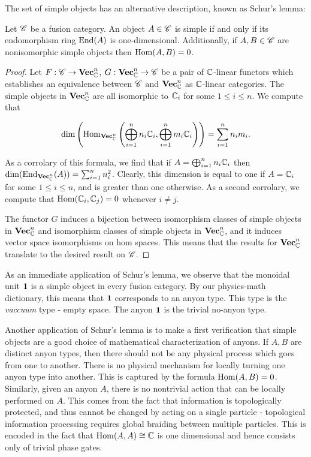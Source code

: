 The set of simple objects has an alternative description, known as Schur's lemma:

\begin{proposition} Let $\mathscr{C}$ be a fusion category. An object $A\in \mathscr{C}$ is simple if and only if its endomorphism ring $\operatorname{End}(A)$ is one-dimensional. Additionally, if $A,B\in \mathscr{C}$ are nonisomorphic simple objects then $\operatorname{Hom}(A,B)=0$.
\end{proposition}
\begin{proof} Let $F:\mathscr{C}\to \mathbf{Vec}_{\mathbb{C}}^n$, $G:\mathbf{Vec}_{\mathbb{C}}^n\to \mathscr{C}$ be a pair of $\mathbb{C}$-linear functors which establishes an equivalence between $\mathscr{C}$ and $\mathbf{Vec}_{\mathbb{C}}^n$ as $\mathbb{C}$-linear categories. The simple objects in $\mathbf{Vec}_{\mathbb{C}}^n$ are all isomorphic to $\mathbb{C}_i$ for some $1\leq i \leq n$. We compute that

$$\dim\left(\operatorname{Hom}_{\mathbf{Vec}_{\mathbb{C}}^n}\left(\bigoplus_{i=1}^n n_i \mathbb{C}_i , \bigoplus_{i=1}^n m_i \mathbb{C}_i\right)\right)=\sum_{i=1}^n n_im_i.$$

As a corrolary of this formula, we find that if $A=\bigoplus_{i=1}^n n_i\mathbb{C}_i$ then $\dim(\operatorname{End}_{\mathbf{Vec}_{\mathbb{C}}^n}(A))=\sum_{i=1}^nn_i^2$. Clearly, this dimension is equal to one if $A=\mathbb{C}_i$ for some $1\leq i\leq n$, and is greater than one otherwise. As a second corrolary, we compute that $\operatorname{Hom}(\mathbb{C}_i,\mathbb{C}_j)=0$ whenever $i\neq j$.

The functor $G$ induces a bijection between isomorphism classes of simple objects in $\mathbf{Vec}_{\mathbb{C}}^n$ and isomorphism classes of simple objects in $\mathbf{Vec}_{\mathbb{C}}^n$, and it induces vector space isomorphisms on hom spaces. This means that the results for $\mathbf{Vec}_{\mathbb{C}}^n$ translate to the desired result on $\mathscr{C}$.
\end{proof}

As an immediate application of Schur's lemma, we observe that the monoidal unit $\mathbf{1}$ is a simple object in every fusion category. By our physics-math dictionary, this means that $\mathbf{1}$ corresponds to an anyon type. This type is the \textit{vaccuum} type - empty space. The anyon $\mathbf{1}$ is the trivial no-anyon type.

Another application of Schur's lemma is to make a first verification that simple objects are a good choice of mathematical characterization of anyons. If $A,B$ are distinct anyon types, then there should not be any physical process which goes from one to another. There is no physical mechanism for locally turning one anyon type into another. This is captured by the formula $\operatorname{Hom}(A,B)=0$. Similarly, given an anyon $A$, there is no nontrivial action that can be locally performed on $A$. This comes from the fact that information is topologically protected, and thus cannot be changed by acting on a single particle - topological information processing requires global braiding between multiple particles. This is encoded in the fact that $\operatorname{Hom}(A,A)\cong \mathbb{C}$ is one dimensional and hence consists only of trivial phase gates.

